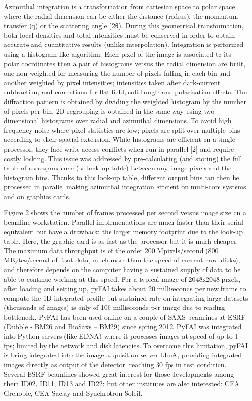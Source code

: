 Azimuthal integration is a transformation from cartesian space to polar space where the radial dimension can be either the distance (radius), the momentum transfer (q) or the scattering angle (2θ).
During this geometrical transformation, both local densities and total intensities must be conserved in order to obtain accurate and quantitative results (unlike interpolation). 
Integration is performed using a histogram-like algorithm: 
Each pixel of the image is associated to its polar coordinates then a
pair of histograms versus the radial dimension are built, one non weighted for measuring the number of pixels falling in each bin and another weighted by pixel intensities; intensities taken after dark-current subtraction, and corrections for flat-field, solid-angle and polarization effects.
The diffraction pattern is obtained by dividing the weighted histogram by the number of pixels per bin. 
2D regrouping is obtained in the same way using two-dimensional histograms over
radial and azimuthal dimensions.
To avoid high frequency noise where pixel statistics are low; pixels are
split over multiple bins according to their spatial extension. 
While histograms are efficient on a single processor, they face write access conflicts when run in parallel [2] and require costly locking. 
This issue was addressed by pre-calculating (and storing) the full table of correspondence (or look-up table) between any image pixels and the histogram bins. 
Thanks to this look-up table, different output bins can then be processed in parallel making azimuthal integration efficient on multi-core systems and on graphics cards.

Figure 2 shows the number of frames processed per second versus image size on a beamline workstation. Parallel implementations are much faster than their serial equivalent but have a drawback: the larger memory footprint due to the look-up table. Here, the graphic card is as fast as the processor but it is much cheaper.
The maximum data throughput is of the order 200 Mpixels/second (800 MBytes/second of float data, much more than the speed of current hard disks), and therefore depends on the computer having a sustained supply of data to be able to continue working at this speed.
For a typical image of 2048x2048 pixels, after loading and setting up, pyFAI takes about 20 milliseconds per new frame to compute the 1D integrated profile but sustained rate on integrating large datasets (thousands of images) is only of 100 milliseconds per image due to reading bottleneck.
PyFAI has been used online on a couple of SAXS beamlines at ESRF (Dubble - BM26
and BioSaxs – BM29) since spring 2012. PyFAI was integrated into Python servers (like EDNA) where it processes images at speed of up to 1 fps; limited by the network and disk latencies.
To overcome this limitation, pyFAI is being integrated into the image acquisition server LImA, providing integrated images directly as output of the detector; reaching 30 fps in test condition.
Several ESRF beamlines showed great interest for those developments among them ID02, ID11, ID13 and ID22; but other institutes are also interested: CEA Grenoble, CEA Saclay and Synchrotron Soleil.

